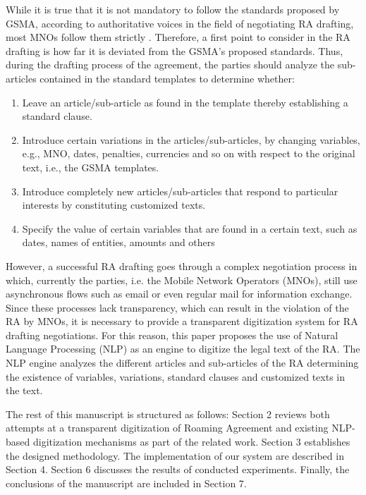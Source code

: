 \documentclass[conference]{style/IEEEtran}
\begin{document}
While it is true that it is not mandatory to follow the standards proposed by GSMA, according to authoritative voices in the field of negotiating RA drafting, most MNOs follow them strictly \cite{b4}. Therefore, a first point to consider in the RA drafting is how far it is deviated from the GSMA's proposed standards. Thus, during the drafting process of the agreement, the parties should analyze the sub-articles contained in the standard templates to determine whether:

\begin{enumerate}
\item Leave an article/sub-article as found in the template thereby establishing a standard clause.

\item Introduce certain variations in the articles/sub-articles, by changing variables, e.g., MNO, dates, penalties, currencies and so on with respect to the original text, i.e., the GSMA templates.

\item Introduce completely new articles/sub-articles that respond to particular interests by constituting customized texts.

\item Specify the value of certain variables that are found in a certain text, such as dates, names of entities, amounts and others

\end{enumerate}

However, a successful RA drafting goes through a complex negotiation process in which, currently the parties, i.e. the Mobile Network Operators (MNOs), still use asynchronous flows such as email or even regular mail for information exchange. Since these processes lack transparency, which can result in the violation of the RA by MNOs, it is necessary to provide a transparent digitization system for RA drafting negotiations. For this reason, this paper proposes the use of Natural Language Processing (NLP) as an engine to digitize the legal text of the RA. The NLP engine analyzes the different articles and sub-articles of the RA determining the existence of variables, variations, standard clauses and customized texts in the text.

The rest of this manuscript is structured as follows: Section 2 reviews both attempts at a transparent digitization of Roaming Agreement and existing NLP-based digitization mechanisms as part of the related work. Section 3 establishes the designed methodology. The implementation of our system are described in Section 4. Section 6 discusses the results of conducted experiments. Finally, the conclusions of the manuscript are included in Section 7.
\end{document}
